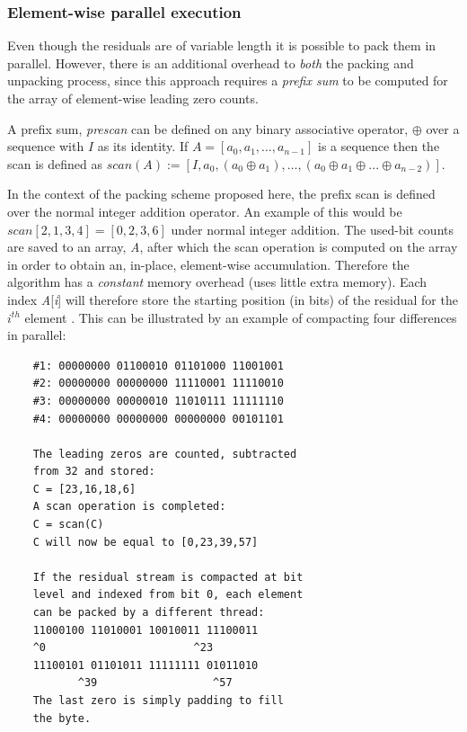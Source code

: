  \subsubsection{Element-wise parallel execution}
 Even though the residuals are of variable length it is possible to pack them in parallel. However, there is an additional overhead to \textit{both} the packing and 
 unpacking process, since this approach requires a \textit{prefix sum} to be computed for the array of element-wise leading zero counts. 
 
 A prefix sum, \textit{prescan} can be defined on any binary associative operator, $\oplus$ over a sequence with $I$ as its identity. If $A=[a_{0},a_{1},\dots,a_{n-1}]$ 
 is a sequence then the scan is defined as $scan(A):=[I,a_{0},(a_{0} \oplus a_{1}),\dots,(a_{0} \oplus a_{1} \oplus ... \oplus a_{n-2})]$.
 
 In the context of the packing scheme proposed here, the prefix scan is defined over the normal integer addition operator. An example of this would be $scan[2,1,3,4] = [0,2,3,6]$ 
 under normal integer addition. The used-bit counts are saved to an array, \textit{A}, after which the scan operation is computed on the array in order to obtain an, in-place, element-wise accumulation. 
 Therefore the algorithm has a \textit{constant} memory overhead (uses little extra memory). Each index \textit{A}[\textit{i}] will therefore store the starting 
 position (in bits) of the residual for the $i^{th}$ element \cite{blelloch1990prefix}. This can be illustrated by an example of compacting four differences in parallel:
 \begin{center}
  \begin{verbatim}
    #1: 00000000 01100010 01101000 11001001
    #2: 00000000 00000000 11110001 11110010
    #3: 00000000 00000010 11010111 11111110
    #4: 00000000 00000000 00000000 00101101
    
    The leading zeros are counted, subtracted 
    from 32 and stored:
    C = [23,16,18,6]
    A scan operation is completed:
    C = scan(C)
    C will now be equal to [0,23,39,57]
    
    If the residual stream is compacted at bit 
    level and indexed from bit 0, each element
    can be packed by a different thread: 
    11000100 11010001 10010011 11100011
    ^0                       ^23       
    11100101 01101011 11111111 01011010
           ^39                  ^57
    The last zero is simply padding to fill 
    the byte.
  \end{verbatim}
 \end{center}


